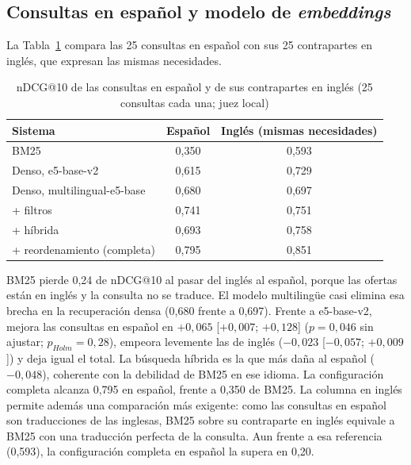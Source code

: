 \subsection{Consultas en español y modelo de \textit{embeddings}}

La Tabla~\ref{tab:res-pe1-idioma} compara las 25 consultas en español con sus 25 contrapartes en inglés, que expresan las mismas necesidades.

\begin{table}[htbp!]
    \centering
    \caption{nDCG@10 de las consultas en español y de sus contrapartes en inglés (25 consultas cada una; juez local)}
    \label{tab:res-pe1-idioma}
    \begin{tabular}{|l|c|c|}
        \hline
        \textbf{Sistema} & \textbf{Español} & \textbf{Inglés (mismas necesidades)} \\
        \hline
        BM25 & 0{,}350 & 0{,}593 \\
        \hline
        Denso, e5-base-v2 & 0{,}615 & 0{,}729 \\
        \hline
        Denso, multilingual-e5-base & 0{,}680 & 0{,}697 \\
        \hline
        + filtros & 0{,}741 & 0{,}751 \\
        \hline
        + híbrida & 0{,}693 & 0{,}758 \\
        \hline
        + reordenamiento (completa) & 0{,}795 & 0{,}851 \\
        \hline
    \end{tabular}
\end{table}

BM25 pierde 0,24 de nDCG@10 al pasar del inglés al español, porque las ofertas están en inglés y la consulta no se traduce. El modelo multilingüe casi elimina esa brecha en la recuperación densa (0,680 frente a 0,697). Frente a e5-base-v2, mejora las consultas en español en $+0{,}065$ [$+0{,}007$; $+0{,}128$] ($p = 0{,}046$ sin ajustar; $p_{Holm} = 0{,}28$), empeora levemente las de inglés ($-0{,}023$ [$-0{,}057$; $+0{,}009$]) y deja igual el total. La búsqueda híbrida es la que más daña al español ($-0{,}048$), coherente con la debilidad de BM25 en ese idioma. La configuración completa alcanza 0,795 en español, frente a 0,350 de BM25. La columna en inglés permite además una comparación más exigente: como las consultas en español son traducciones de las inglesas, BM25 sobre su contraparte en inglés equivale a BM25 con una traducción perfecta de la consulta. Aun frente a esa referencia (0,593), la configuración completa en español la supera en 0,20.

